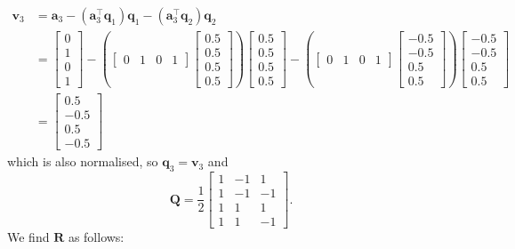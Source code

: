 \begin{align*}
\mathbf v_3 & =   \mathbf a_3  - (\mathbf a_3^\top \mathbf q_1)\mathbf q_1 - (\mathbf a_3^\top \mathbf q_2)\mathbf q_2  \\ 
  &=  \left[ \begin{array}{c}0\\1\\0\\1\end{array} \right] -
\left(
       \left[ \begin{array}{cccc}0&1&0&1\end{array}\right] 
       \left[ \begin{array}{c}0.5\\0.5\\0.5\\0.5\end{array} \right]
\right) \left[ \begin{array}{c}0.5\\0.5\\0.5\\0.5\end{array} \right] 
- \left(
       \left[ \begin{array}{cccc}0&1&0&1\end{array}\right] 
       \left[ \begin{array}{r}-0.5\\-0.5\\0.5\\0.5\end{array} \right]
\right) \left[ \begin{array}{r}-0.5\\-0.5\\0.5\\0.5\end{array} \right] \\
  &= 
\left[ \begin{array}{r}0.5\\-0.5\\0.5\\-0.5\end{array} \right] 
\end{align*}
which is also normalised, so $\mathbf q_3 = \mathbf v_3$ and 
\[ 
\mathbf Q = \frac{1}{2}
 \left[ \begin{array}{rrr}1&-1&1\\1&-1&-1\\1&1&1\\1&1&-1\end{array}\right].
\]
We find $\mathbf R$ as follows:
